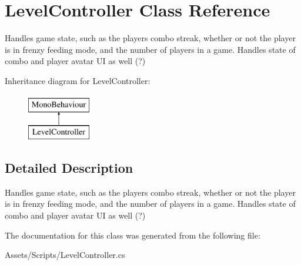 \hypertarget{class_level_controller}{}\section{Level\+Controller Class Reference}
\label{class_level_controller}


Handles game state, such as the player\textquotesingle{}s combo streak, whether or not the player is in frenzy feeding mode, and the number of players in a game. Handles state of combo and player avatar UI as well (?)  


Inheritance diagram for Level\+Controller\+:\begin{figure}[H]
\begin{center}
\leavevmode
\includegraphics[height=2.000000cm]{class_level_controller}
\end{center}
\end{figure}


\subsection{Detailed Description}
Handles game state, such as the player\textquotesingle{}s combo streak, whether or not the player is in frenzy feeding mode, and the number of players in a game. Handles state of combo and player avatar UI as well (?) 



The documentation for this class was generated from the following file\+:\begin{DoxyCompactItemize}
\item 
Assets/\+Scripts/Level\+Controller.\+cs\end{DoxyCompactItemize}
